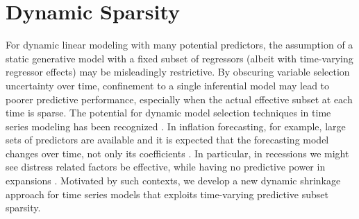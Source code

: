 \documentclass[ba]{imsart}
\numberwithin{equation}{section}
\theoremstyle{plain}
\def\v{\mbox{\boldmath$v$}}
\begin{document}
\begin{frontmatter}
\begin{abstract}
 
\end{abstract}

\begin{keyword}
\end{keyword}


\end{frontmatter}

 




\section{Dynamic Sparsity}

For dynamic linear modeling with many potential predictors, the assumption of a static generative model with a fixed subset of regressors (albeit with time-varying regressor effects) may be misleadingly  restrictive.  By obscuring variable selection uncertainty over time, confinement to a single inferential model may lead to poorer predictive performance, especially when the actual effective subset at each time is sparse. The potential for dynamic model selection techniques in time series modeling has been  recognized \citep{fruhwirth_wagner,groen, nakajima_west, kalli_griffin,chan_koop}. In  inflation forecasting, for example, {large sets of predictors are available  and it is expected that} the forecasting model changes over time, not only its coefficients \citep{KoopKorobilis2012,groen,kalli_griffin,wright2009forecasting}.
In particular, in recessions {we might see distress related factors be effective, while having no predictive power}  in expansions \citep{KoopKorobilis2012}. Motivated by such contexts, we develop a new dynamic shrinkage approach for time series models that exploits time-varying predictive subset sparsity.
\end{document}
